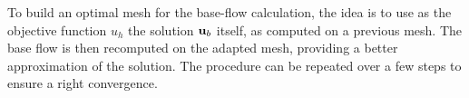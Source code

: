\documentclass[twocolumn,10pt]{asme2ej}
\begin{document}
To build an optimal mesh for the base-flow calculation, the idea is to use as the objective function $u_h$ the solution ${\bf u}_b$ itself, as computed on a previous mesh. %
The base flow is then recomputed on the adapted mesh, providing a better approximation of the solution. The procedure can be repeated over a few steps to ensure a right convergence.

\end{document}
